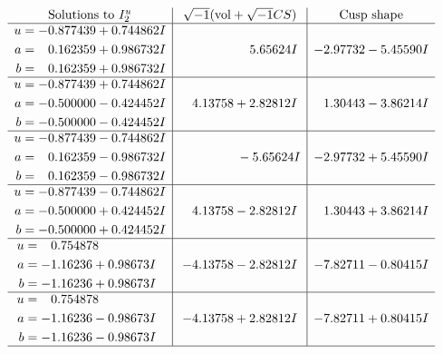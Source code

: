 \documentclass[1p]{elsarticle_modified}
\theoremstyle{definition}
\newcommand{\I}{\sqrt{-1}}
\begin{document}
$$\begin{array}{c|c|c}  
\text{Solutions to }I^u_{2}& \I (\text{vol} + \sqrt{-1}CS) & \text{Cusp shape}\\
 \hline 
\begin{aligned}
u &= -0.877439 + 0.744862 I \\
a &= \phantom{-}0.162359 + 0.986732 I \\
b &= \phantom{-}0.162359 + 0.986732 I\end{aligned}
 & \phantom{-0.000000 -}5.65624 I & -2.97732 - 5.45590 I \\ \hline\begin{aligned}
u &= -0.877439 + 0.744862 I \\
a &= -0.500000 - 0.424452 I \\
b &= -0.500000 - 0.424452 I\end{aligned}
 & \phantom{-}4.13758 + 2.82812 I & \phantom{-}1.30443 - 3.86214 I \\ \hline\begin{aligned}
u &= -0.877439 - 0.744862 I \\
a &= \phantom{-}0.162359 - 0.986732 I \\
b &= \phantom{-}0.162359 - 0.986732 I\end{aligned}
 & \phantom{-0.000000 } -5.65624 I & -2.97732 + 5.45590 I \\ \hline\begin{aligned}
u &= -0.877439 - 0.744862 I \\
a &= -0.500000 + 0.424452 I \\
b &= -0.500000 + 0.424452 I\end{aligned}
 & \phantom{-}4.13758 - 2.82812 I & \phantom{-}1.30443 + 3.86214 I \\ \hline\begin{aligned}
u &= \phantom{-}0.754878\phantom{ +0.000000I} \\
a &= -1.16236 + 0.98673 I \\
b &= -1.16236 + 0.98673 I\end{aligned}
 & -4.13758 - 2.82812 I & -7.82711 - 0.80415 I \\ \hline\begin{aligned}
u &= \phantom{-}0.754878\phantom{ +0.000000I} \\
a &= -1.16236 - 0.98673 I \\
b &= -1.16236 - 0.98673 I\end{aligned}
 & -4.13758 + 2.82812 I & -7.82711 + 0.80415 I\\
 \hline 
 \end{array}$$\newpage\newpage\renewcommand{\arraystretch}{1}
\end{document}
